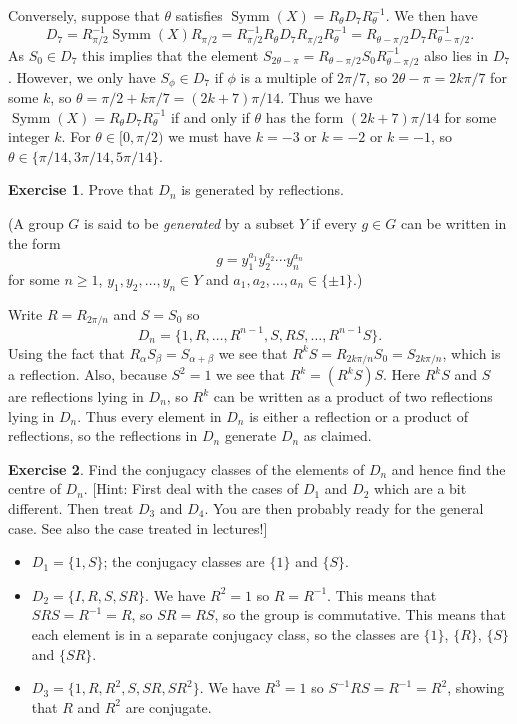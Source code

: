 \documentclass{amsart}
\DeclareMathOperator{\Symm}{Symm}
\renewcommand{\:}{\colon}
\newcommand{\al}        {\alpha}
\newcommand{\bt}        {\beta}
\newcommand{\tht}       {\theta}
\theoremstyle{definition}
\newtheorem{exercise}{Exercise}
\newenvironment{solution}{{\noindent\bf Solution:}}{}
\begin{document}
\begin{solution}
\begin{itemize}
   Conversely, suppose that $\tht$ satisfies 
   $\Symm(X)=R_\tht D_7R_\tht^{-1}$.  We then have
   \[ D_7 = R_{\pi/2}^{-1}\Symm(X)R_{\pi/2} =
            R_{\pi/2}^{-1}R_\tht D_7 R_{\pi/2}R_\tht^{-1} = 
            R_{\tht-\pi/2}D_7R_{\tht-\pi/2}^{-1}.
   \]
   As $S_0\in D_7$ this implies that the element
   $S_{2\tht-\pi}=R_{\tht-\pi/2}S_0R_{\tht-\pi/2}^{-1}$ also lies in
   $D_7$.  However, we only have $S_\phi\in D_7$ if $\phi$ is a multiple
   of $2\pi/7$, so $2\tht-\pi=2k\pi/7$ for some $k$, so
   $\tht=\pi/2+k\pi/7=(2k+7)\pi/14$.  Thus we have
   $\Symm(X)=R_\tht D_7R_\tht^{-1}$ if and only if $\tht$ has the form
   $(2k+7)\pi/14$ for some integer $k$.  For $\tht\in[0,\pi/2)$ we
   must have $k=-3$ or $k=-2$ or $k=-1$, so
   $\tht\in\{\pi/14,3\pi/14,5\pi/14\}$. 
 \end{itemize} 
\end{solution}

\begin{exercise}
Prove that $D_n$ is generated by reflections.

(A group $G$ is said to be {\em generated} by a subset $Y$ if every
$g\in G$ can be written in the form
\[ g = y_1^{a_1}y_2^{a_2}\cdots y_n^{a_n} \]
for some $n \geq 1$, $y_1,y_2,\ldots,y_n\in Y$ and
$a_1,a_2,\ldots,a_n\in\{\pm 1\}$.)

\end{exercise}
\begin{solution}
 Write $R=R_{2\pi/n}$ and $S=S_0$ so 
 \[ D_n=\{1,R,\ldots,R^{n-1},S,RS,\ldots,R^{n-1}S\}. \]
 Using the fact that $R_\al S_\bt=S_{\al+\bt}$ we see that
 $R^kS=R_{2k\pi/n}S_0=S_{2k\pi/n}$, which is a reflection.  Also,
 because $S^2=1$ we see that $R^k=(R^kS)S$.  Here $R^kS$ and $S$ are
 reflections lying in $D_n$, so $R^k$ can be written as a product of
 two reflections lying in $D_n$.  Thus every element in $D_n$ is
 either a reflection or a product of reflections, so the reflections
 in $D_n$ generate $D_n$ as claimed.
\end{solution}

\begin{exercise}
 Find the conjugacy classes of the elements of $D_n$ and hence find the
 centre of $D_n$.  [Hint: First deal with the cases of $D_1$ and $D_2$
 which are a bit different.  Then treat $D_3$ and $D_4$. You are then
 probably ready for the general case. See also the case treated in
 lectures!]
\end{exercise}
\begin{solution}
 \begin{itemize}
  \item $D_1=\{1,S\}$; the conjugacy classes are $\{1\}$ and $\{S\}$.
  \item $D_2=\{I,R,S,SR\}$.  We have $R^2=1$ so $R=R^{-1}$.  This
    means that $SRS=R^{-1}=R$, so $SR=RS$, so the group is
    commutative.  This means that each element is in a separate
    conjugacy class, so the classes are $\{1\}$, $\{R\}$, $\{S\}$ and
    $\{SR\}$. 
  \item $D_3=\{1,R,R^2,S,SR,SR^2\}$.  We have $R^3=1$ so
   $S^{-1}RS=R^{-1}=R^2$, showing that $R$ and $R^2$ are conjugate.  
 \end{itemize}
\end{solution}
\end{document}
